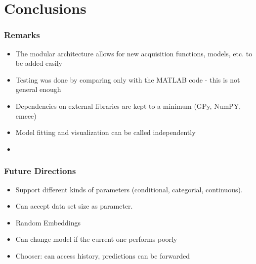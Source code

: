 \documentclass[10pt,handout]{beamer}
\begin{document}
\section{Conclusions}


\begin{frame}
\frametitle{Remarks}

\begin{itemize}[<+->]
	\item The modular architecture allows for new acquisition functions, 
	models, etc. to be added easily
	\item Testing was done by comparing only with the MATLAB code - this
	is not general enough
	\item Dependencies on external libraries are kept to a minimum (GPy, NumPY,
	emcee)
	\item Model fitting and visualization can be called independently
	\item 

\end{itemize}


\end{frame}


\begin{frame}
\frametitle{Future Directions}

\begin{itemize}
\item Support different kinds of parameters (conditional, categorial, continuous).
\item Can accept data set size as parameter.
\item Random Embeddings
\item Can change model if the current one performs poorly
\item Chooser: can access history, predictions can be forwarded
\end{itemize}

\end{frame}


%
\end{document}
